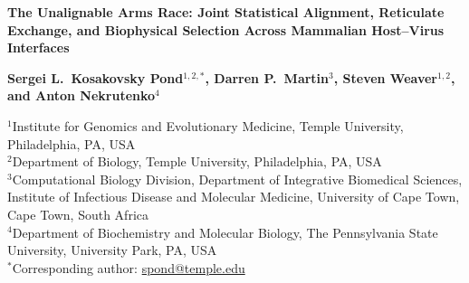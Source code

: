 \documentclass[11pt,letterpaper]{article}
\begin{document}
\thispagestyle{empty}

\newcommand{\headerrule}{\noindent\rule{\textwidth}{0.6pt}\par\medskip}
\begin{center}
    {\LARGE\bfseries The Unalignable Arms Race: Joint Statistical Alignment, Reticulate Exchange, and Biophysical Selection Across Mammalian Host--Virus Interfaces \par}
    \vspace{0.6em}
    {\large\bfseries Sergei L.\ Kosakovsky Pond$^{1,2,*}$, Darren P.\ Martin$^{3}$, Steven Weaver$^{1,2}$, and Anton Nekrutenko$^{4}$ \par}
    \vspace{0.4em}
    {\small
    $^1$Institute for Genomics and Evolutionary Medicine, Temple University, Philadelphia, PA, USA \\
    $^2$Department of Biology, Temple University, Philadelphia, PA, USA \\
    $^3$Computational Biology Division, Department of Integrative Biomedical Sciences, Institute of Infectious Disease and Molecular Medicine, University of Cape Town, Cape Town, South Africa \\
    $^4$Department of Biochemistry and Molecular Biology, The Pennsylvania State University, University Park, PA, USA \\
    \vspace{0.2em}
    $^*$Corresponding author: \href{mailto:spond@temple.edu}{spond@temple.edu}
    \par}
\end{center}
\end{document}
